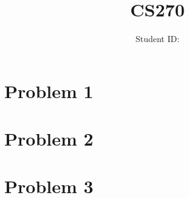 \documentclass{article}
\title{CS270 \exerciseset}
\author{\studentname \qquad Student ID: \suid}
\begin{document}
\maketitle

\section*{Problem 1}


\section*{Problem 2}


\section*{Problem 3} 
\end{document}
